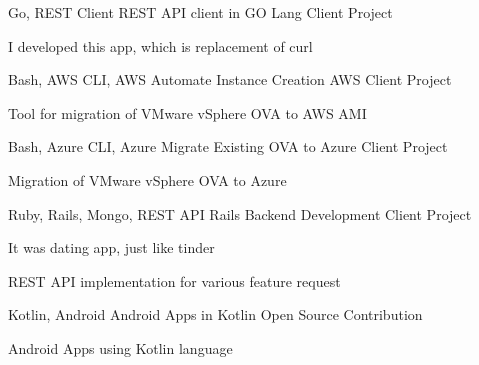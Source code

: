 \begin{cventries}
  \cventry
    {Go, REST Client} %
    {REST API client in GO Lang} %
    {Client Project} %
    {} %
    {
      \begin{cvitems} %
        \item {I developed this app, which is replacement of curl}
      \end{cvitems}
    }
  
  \cventry
    {Bash, AWS CLI, AWS} %
    {Automate Instance Creation AWS} %
    {Client Project} %
    {} %
    {
      \begin{cvitems} %
        \item {Tool for migration of VMware vSphere OVA to AWS AMI}
      \end{cvitems}
    }

  \cventry
    {Bash, Azure CLI, Azure} %
    {Migrate Existing OVA to Azure} %
    {Client Project} %
    {} %
    {
      \begin{cvitems} %
        \item {Migration of VMware vSphere OVA to Azure}
      \end{cvitems}
    }

  \cventry
    {Ruby, Rails, Mongo, REST API} %
    {Rails Backend Development} %
    {Client Project} %
    {} %
    {
      \begin{cvitems} %
        \item {It was dating app, just like tinder}
        \item {REST API implementation for various feature request}
      \end{cvitems}
    }

  \cventry
    {Kotlin, Android} %
    {Android Apps in Kotlin} %
    {Open Source Contribution } %
    {} %
    {
      \begin{cvitems} %
        \item {Android Apps using Kotlin language}
      \end{cvitems}
    }





\end{cventries}
